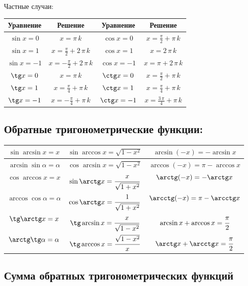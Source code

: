 Частные случаи:

\begin{tabular}[t]{||c|c||c|c||}
	\hline
		Уравнение & Решение & Уравнение & Решение \tabularnewline
	\hline
		$ \sin x = 0 $ & 	$ x = \pi\, k $ & 				$ \cos x = 0 $ &	$ x = \frac{\pi}{2} + \pi\, k $ \tabularnewline
	\hline
		$ \sin x = 1 $ & 	$ x = \frac{\pi}{2} + 2\, \pi\, k $ & 	$ \cos x = 1 $ & 	$ x = 2\, \pi\, k $ \tabularnewline
	\hline
		$ \sin x = -1 $ & 	$ x = -\frac{\pi}{2} + 2\, \pi\, k $ & 	$ \cos x = -1 $ & 	$ x = \pi + 2\, \pi\, k $ \tabularnewline
	\hline
		$ \tg x = 0 $ & 	$ x = \pi\, k $ & 				$ \ctg x = 0 $ & 	$ x = \frac{\pi}{2} + \pi\, k $ \tabularnewline
	\hline
		$ \tg x = 1 $ & 	$ x = \frac{\pi}{4} + \pi\, k $ & 		$ \ctg x = 1 $ & 	$ x = \frac{\pi}{4} + \pi\, k $ \tabularnewline
	\hline
		$ \tg x = -1 $ & 	$ x = -\frac{\pi}{4} + \pi\, k $ & 		$ \ctg x = -1 $ & 	$ x = \frac{3\, \pi}{4} + \pi\, k $ \tabularnewline
	\hline
\end{tabular}

\subsection{Обратные тригонометрические функции:}

{\renewcommand{\arraystretch}{1}
\begin{tabular}[t]{||c||c||c||}
	\hline
		$ \sin\arcsin x = x $            & $ \sin\arccos x = \sqrt{1-x^2} $          & $ \arcsin(-x) = -\arcsin x $              \tabularnewline
	\hline
		$ \arcsin\sin\alpha = \alpha $   & $ \cos\arcsin x = \sqrt{1-x^2} $            & $ \arccos(-x) = \pi - \arccos x $         \tabularnewline
	\hline
	\hline
		$ \cos\arccos x = x $            & $ \sin\arctg x = \cfrac{x}{\sqrt{1+x^2}} $ & $ \arctg(-x) = -\arctg x $                \tabularnewline
	\hline
		$ \arccos\cos\alpha = \alpha $   & $ \cos\arctg x = \cfrac{1}{\sqrt{1+x^2}} $ & $ \arcctg(-x) = \pi - \arcctg x $         \tabularnewline
	\hline
	\hline
		$ \tg\arctg x = x $              & $ \tg\arcsin x = \cfrac{x}{\sqrt{1-x^2}} $ & $ \arcsin x + \arccos x = \cfrac{\pi}{2} $ \tabularnewline
	\hline
		$ \arctg\tg\alpha = \alpha $     & $ \tg\arccos x = \cfrac{\sqrt{1-x^2}}{x} $ & $ \arctg x + \arcctg x = \cfrac{\pi}{2} $  \tabularnewline
	\hline
\end{tabular}}

\subsection{Сумма обратных тригонометрических функций}

